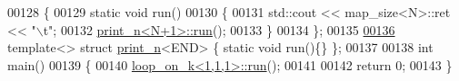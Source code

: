 \begin{DoxyCode}
00128 \{
00129   \textcolor{keyword}{static} \textcolor{keywordtype}{void} run()
00130   \{
00131     std::cout << map\_size<N>::ret << \textcolor{stringliteral}{"\(\backslash\)t"};
00132     \hyperlink{structprint__n}{print\_n<N+1>::run}();
00133   \}
00134 \};
00135 
\hyperlink{structprint__n_3_01_e_n_d_01_4}{00136} \textcolor{keyword}{template}<> \textcolor{keyword}{struct }\hyperlink{structprint__n}{print\_n}<END> \{ \textcolor{keyword}{static} \textcolor{keywordtype}{void} run()\{\} \};
00137 
00138 \textcolor{keywordtype}{int} main()
00139 \{
00140   \hyperlink{structloop__on__k}{loop\_on\_k<1,1,1>::run}();
00141   
00142   \textcolor{keywordflow}{return} 0; 
00143 \}
\end{DoxyCode}
